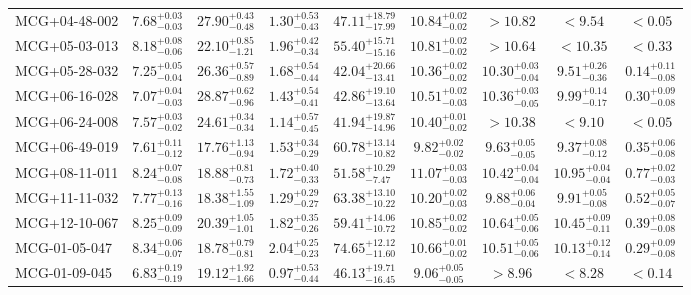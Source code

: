 \documentclass[onecolumn]{mn2e}
\begin{document}
{\begin{center}
\begin{longtable}{lcccccccc}
MCG+04-48-002 & $7.68_{-0.03}^{+0.03}$ & $27.90_{-0.48}^{+0.43}$ & $1.30_{-0.43}^{+0.53}$ &$47.11_{-17.99}^{+18.79}$ & $10.84_{-0.02}^{+0.02}$ & $>10.82$ & $<9.54$ & $<0.05$ \\
MCG+05-03-013 & $8.18_{-0.06}^{+0.08}$ & $22.10_{-1.21}^{+0.85}$ & $1.96_{-0.34}^{+0.42}$ &$55.40_{-15.16}^{+15.71}$ & $10.81_{-0.02}^{+0.02}$ & $>10.64$ & $<10.35$ & $<0.33$ \\
MCG+05-28-032 & $7.25_{-0.04}^{+0.05}$ & $26.36_{-0.89}^{+0.57}$ & $1.68_{-0.44}^{+0.54}$ &$42.04_{-13.41}^{+20.66}$ & $10.36_{-0.02}^{+0.02}$ & $10.30_{-0.04}^{+0.03}$ & $9.51_{-0.36}^{+0.26}$ & $0.14_{-0.08}^{+0.11}$ \\
MCG+06-16-028 & $7.07_{-0.03}^{+0.04}$ & $28.87_{-0.96}^{+0.62}$ & $1.43_{-0.41}^{+0.54}$ &$42.86_{-13.64}^{+19.10}$ & $10.51_{-0.03}^{+0.02}$ & $10.36_{-0.05}^{+0.03}$ & $9.99_{-0.17}^{+0.14}$ & $0.30_{-0.08}^{+0.09}$ \\
MCG+06-24-008 & $7.57_{-0.02}^{+0.03}$ & $24.61_{-0.34}^{+0.34}$ & $1.14_{-0.45}^{+0.57}$ &$41.94_{-14.96}^{+19.87}$ & $10.40_{-0.02}^{+0.01}$ & $>10.38$ & $<9.10$ & $<0.05$ \\
MCG+06-49-019 & $7.61_{-0.12}^{+0.11}$ & $17.76_{-0.94}^{+1.13}$ & $1.53_{-0.29}^{+0.34}$ &$60.78_{-10.82}^{+13.14}$ & $9.82_{-0.02}^{+0.02}$ & $9.63_{-0.05}^{+0.05}$ & $9.37_{-0.12}^{+0.08}$ & $0.35_{-0.08}^{+0.06}$ \\
MCG+08-11-011 & $8.24_{-0.08}^{+0.07}$ & $18.88_{-0.73}^{+0.81}$ & $1.72_{-0.33}^{+0.40}$ &$51.58_{-7.47}^{+10.29}$ & $11.07_{-0.03}^{+0.03}$ & $10.42_{-0.04}^{+0.04}$ & $10.95_{-0.04}^{+0.04}$ & $0.77_{-0.03}^{+0.02}$ \\
MCG+11-11-032 & $7.77_{-0.16}^{+0.13}$ & $18.38_{-1.09}^{+1.55}$ & $1.29_{-0.27}^{+0.29}$ &$63.38_{-10.22}^{+13.10}$ & $10.20_{-0.03}^{+0.02}$ & $9.88_{-0.04}^{+0.06}$ & $9.91_{-0.08}^{+0.05}$ & $0.52_{-0.07}^{+0.05}$ \\
MCG+12-10-067 & $8.25_{-0.09}^{+0.09}$ & $20.39_{-1.01}^{+1.05}$ & $1.82_{-0.26}^{+0.35}$ &$59.41_{-10.72}^{+14.06}$ & $10.85_{-0.02}^{+0.02}$ & $10.64_{-0.06}^{+0.05}$ & $10.45_{-0.11}^{+0.09}$ & $0.39_{-0.08}^{+0.08}$ \\
MCG-01-05-047 & $8.34_{-0.07}^{+0.06}$ & $18.78_{-0.81}^{+0.79}$ & $2.04_{-0.23}^{+0.25}$ &$74.65_{-11.60}^{+12.12}$ & $10.66_{-0.02}^{+0.01}$ & $10.51_{-0.06}^{+0.05}$ & $10.13_{-0.14}^{+0.12}$ & $0.29_{-0.08}^{+0.09}$ \\
MCG-01-09-045 & $6.83_{-0.19}^{+0.19}$ & $19.12_{-1.66}^{+1.92}$ & $0.97_{-0.44}^{+0.53}$ &$46.13_{-16.45}^{+19.71}$ & $9.06_{-0.05}^{+0.05}$ & $>8.96$ & $<8.28$ & $<0.14$ \\

\end{longtable}
\end{center}}
\end{document}
